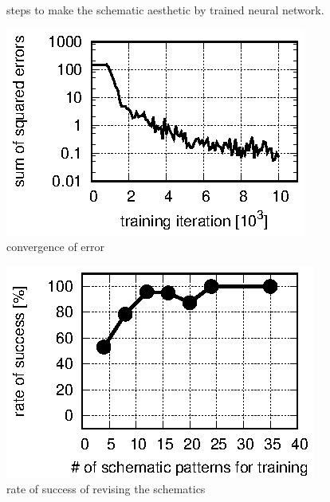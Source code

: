 \documentclass[twocolumn]{article}
\begin{document}
\begin{figure}[tb]
\begin{center}
\begin{minipage}{\hsize}
   \caption{steps to make the schematic aesthetic by trained neural network.}
   \label{fig:edit_steps}
  \end{minipage}
 \end{center}
\end{figure}

\begin{figure}[tb]
 \begin{center}
  \begin{minipage}{\hsize}
   \includegraphics[width=\hsize]{fig/errors.eps}
   \caption{convergence of error}
   \label{fig:errors}
  \end{minipage}
 \end{center}
\end{figure}

\begin{figure}[tb]
 \begin{center}
  \begin{minipage}{\hsize}
   \includegraphics[width=\hsize]{fig/test_data.eps}
   \caption{rate of success of revising the schematics}
   \label{fig:test_data}
  \end{minipage}
 \end{center}
\end{figure}
\end{document}
